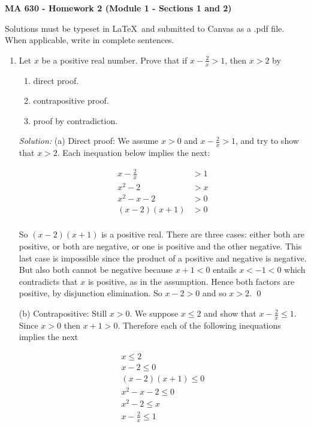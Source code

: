 \documentclass[12pt]{article}
\begin{document}
\pagestyle{empty}

 {\noindent \textbf{\large MA 630 - Homework 2 (Module 1 - Sections 1 and 2)}
\vspace{.25in}

\noindent Solutions must be typeset in \LaTeX \ and submitted to Canvas as a .pdf file. When applicable, write in complete sentences.
\vspace{.25in}


\begin{enumerate}

\item Let $x$ be a positive real number. Prove that if $\displaystyle x - \frac{2}{x} > 1$, then $x > 2$ by
	\begin{enumerate}
	\item direct proof.
	\item contrapositive proof.
	\item proof by contradiction.
	\end{enumerate}
	
{\it Solution:} (a) Direct proof: We assume $x>0$ and $x - \frac 2 x > 1$, and try to show that $x > 2$.  Each inequation below implies the next:

\begin{align*}
    x - \frac 2 x &> 1 \\
    x^2 - 2 &> x \\
    x^2 - x - 2 &> 0 \\
    (x-2)(x+1) &> 0\\
\end{align*}

So $(x-2)(x+1)$ is a positive real.  There are three cases: either both are positive, or both are negative, or one is positive and the other negative.  This last case is impossible since the product of a positive and negative is negative. But also both cannot be negative because $x+1<0$ entails $x<-1<0$ which contradicts that $x$ is positive, as in the assumption.  Hence both factors are positive, by disjunction elimination.  So $x-2>0$ and so $x>2$.  \qed

(b) Contrapositive: Still $x>0$.  We suppose $x\leq 2$ and show that $x-\frac 2 x \leq 1$.  Since $x>0$ then $x+1>0$.  Therefore each of the following inequations implies the next

\begin{align*}
    x \leq 2 \\
    x-2\leq 0 \\
    (x-2)(x+1) \leq 0 \\
    x^2  - x - 2 \leq 0 \\
    x^2 - 2 \leq x \\
    x - \frac 2 x \leq 1\\
\end{align*}


\end{enumerate}}
\end{document}
